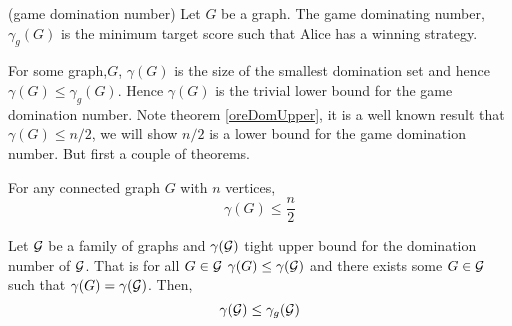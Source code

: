 \begin{definition}(game domination number)
    Let $G$ be a graph. The game dominating number, $\gamma_g(G)$ is the minimum target score such that Alice has a winning strategy.
\end{definition} 

%        
%
%    
%
%
%
%
%    
    
For some graph,$G$, $\gamma(G)$ is the size of the smallest domination set and hence $\gamma(G)\leq\gamma_g(G)$. Hence $\gamma(G)$ is the trivial lower bound for the game domination number. Note theorem \ref{oreDomUpper}, it is a well known result that $\gamma(G) \leq n/2$, we will show $n/2$ is a lower bound for the game domination number. But first a couple of theorems.

\begin{theorem} \label{oreDomUpper} 
    For any connected graph $G$ with $n$ vertices,     
    \[\gamma(G) \leq \frac{n}{2}\]
\end{theorem}


\begin{theorem}\label{thm:domlow}
    Let $\mathcal{G}$ be a family of graphs and $\gamma(\mathcal{G})$ tight upper bound for the domination number of $\mathcal{G}$. That is for all $G\in\mathcal{G}$ $\gamma(G)\leq\gamma(\mathcal{G})$ and there exists some $G\in\mathcal{G}$ such that $\gamma(G)=\gamma(\mathcal{G})$. Then,
    \[\gamma(\mathcal{G}) \leq  \gamma_g(\mathcal{G})\]
\end{theorem}


